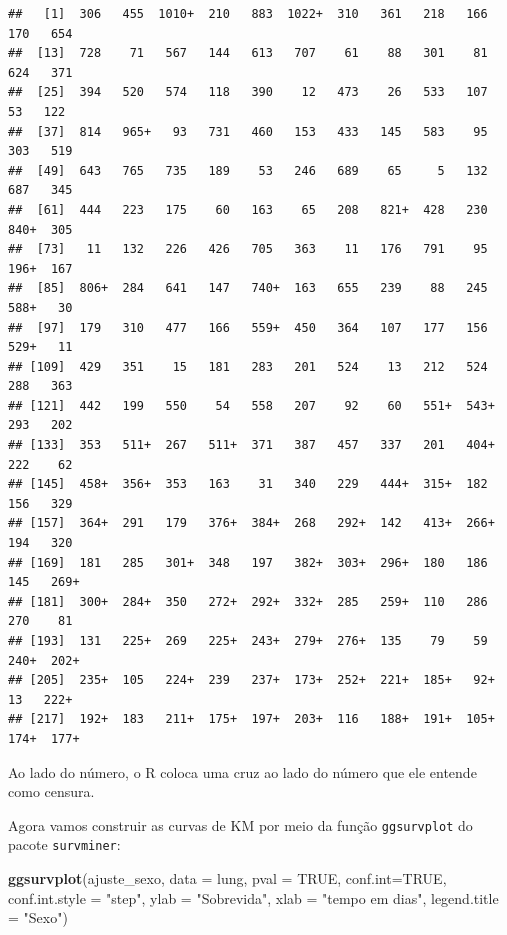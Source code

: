 \documentclass[
]{book}
\newenvironment{Shaded}{\begin{snugshade}}{\end{snugshade}}
\newcommand{\DataTypeTok}[1]{\textcolor[rgb]{0.13,0.29,0.53}{#1}}
\newcommand{\KeywordTok}[1]{\textcolor[rgb]{0.13,0.29,0.53}{\textbf{#1}}}
\newcommand{\NormalTok}[1]{#1}
\newcommand{\OperatorTok}[1]{\textcolor[rgb]{0.81,0.36,0.00}{\textbf{#1}}}
\newcommand{\OtherTok}[1]{\textcolor[rgb]{0.56,0.35,0.01}{#1}}
\newcommand{\StringTok}[1]{\textcolor[rgb]{0.31,0.60,0.02}{#1}}
\begin{document}
\begin{Shaded}
\end{Shaded}

\begin{verbatim}
##   [1]  306   455  1010+  210   883  1022+  310   361   218   166   170   654 
##  [13]  728    71   567   144   613   707    61    88   301    81   624   371 
##  [25]  394   520   574   118   390    12   473    26   533   107    53   122 
##  [37]  814   965+   93   731   460   153   433   145   583    95   303   519 
##  [49]  643   765   735   189    53   246   689    65     5   132   687   345 
##  [61]  444   223   175    60   163    65   208   821+  428   230   840+  305 
##  [73]   11   132   226   426   705   363    11   176   791    95   196+  167 
##  [85]  806+  284   641   147   740+  163   655   239    88   245   588+   30 
##  [97]  179   310   477   166   559+  450   364   107   177   156   529+   11 
## [109]  429   351    15   181   283   201   524    13   212   524   288   363 
## [121]  442   199   550    54   558   207    92    60   551+  543+  293   202 
## [133]  353   511+  267   511+  371   387   457   337   201   404+  222    62 
## [145]  458+  356+  353   163    31   340   229   444+  315+  182   156   329 
## [157]  364+  291   179   376+  384+  268   292+  142   413+  266+  194   320 
## [169]  181   285   301+  348   197   382+  303+  296+  180   186   145   269+
## [181]  300+  284+  350   272+  292+  332+  285   259+  110   286   270    81 
## [193]  131   225+  269   225+  243+  279+  276+  135    79    59   240+  202+
## [205]  235+  105   224+  239   237+  173+  252+  221+  185+   92+   13   222+
## [217]  192+  183   211+  175+  197+  203+  116   188+  191+  105+  174+  177+
\end{verbatim}

Ao lado do número, o R coloca uma cruz ao lado do número que ele entende como censura.

Agora vamos construir as curvas de KM por meio da função \texttt{ggsurvplot} do pacote \texttt{survminer}:

\begin{Shaded}
\begin{Highlighting}[]
\KeywordTok{ggsurvplot}\NormalTok{(ajuste_sexo, }\DataTypeTok{data =}\NormalTok{ lung,}
           \DataTypeTok{pval =} \OtherTok{TRUE}\NormalTok{, }\DataTypeTok{conf.int=}\OtherTok{TRUE}\NormalTok{, }\DataTypeTok{conf.int.style =} \StringTok{"step"}\NormalTok{,}
           \DataTypeTok{ylab =} \StringTok{"Sobrevida"}\NormalTok{, }\DataTypeTok{xlab =} \StringTok{"tempo em dias"}\NormalTok{, }\DataTypeTok{legend.title =} \StringTok{"Sexo"}\NormalTok{)  }
\end{Highlighting}
\end{Shaded}
\end{document}
